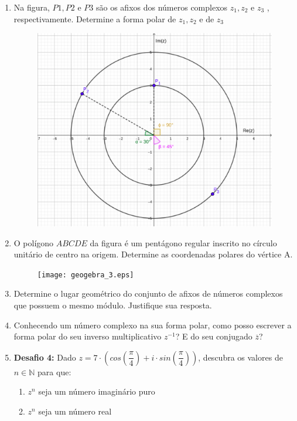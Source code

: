 \documentclass[a4paper, 11pt]{article}
\begin{document}
\begin{enumerate}
\item Na figura, $P1, P2 \textrm{ e } P3$ são os afixos dos números complexos $z_1, z_2 \textrm{ e } z_3$ , respectivamente. Determine a forma polar de $z_1, z_2 \textrm{ e de } z_3$
	\begin{figure}[h]
	\centering
	\includegraphics[scale=0.2]{geogebra_2.eps}
	\end{figure}

\item O polígono $ABCDE$ da figura é um pentágono regular inscrito no círculo unitário de centro na origem. Determine as coordenadas polares do vértice A.
	\begin{figure}[!h]
	\centering
	\texttt{[image: geogebra\_3.eps]}
	\end{figure}

\item Determine o lugar geométrico do conjunto de afixos de números complexos que possuem o mesmo módulo. Justifique sua resposta.	

\item Conhecendo um número complexo na sua forma polar, como posso escrever a forma polar do seu inverso multiplicativo $z^{-1}$? E do seu conjugado $\overline{z}$?

\item \textbf{Desafio 4:} Dado $z = 7\cdot(cos(\dfrac{\pi}{4}) + i\cdot sin(\dfrac{\pi}{4}))$, descubra os valores de $n \in \mathbb{N}$ para que:
	\begin{enumerate}
	\item $z^n$ seja um número imaginário puro
	\item $z^n$ seja um número real
	

\end{enumerate}
\end{enumerate}
\end{document}
